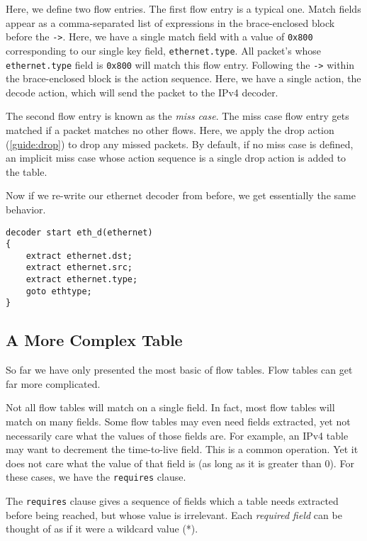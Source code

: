 Here, we define two flow entries. The first flow entry is a typical one. Match fields appear as a comma-separated list of expressions in the brace-enclosed block before the \texttt{->}. Here, we have a single match field with a value of \texttt{0x800} corresponding to our single key field, \texttt{ethernet.type}. All packet's whose \texttt{ethernet.type} field is \texttt{0x800} will match this flow entry. Following the \texttt{->} within the brace-enclosed block is the action sequence. Here, we have a single action, the decode action, which will send the packet to the IPv4 decoder.

The second flow entry is known as the \textit{miss case}. The miss case flow entry gets matched if a packet matches no other flows. Here, we apply the drop action (\ref{guide:drop}) to drop any missed packets. By default, if no miss case is defined, an implicit miss case whose action sequence is a single drop action is added to the table.

Now if we re-write our ethernet decoder from before, we get essentially the same behavior.

\begin{codepage}
\begin{lstlisting}
decoder start eth_d(ethernet)
{
	extract ethernet.dst;
	extract ethernet.src;
	extract ethernet.type;
	goto ethtype;
}
\end{lstlisting}
\end{codepage}

\subsection{A More Complex Table} \label{tut:complex_table}

So far we have only presented the most basic of flow tables. Flow tables can get far more complicated.

Not all flow tables will match on a single field. In fact, most flow tables will match on many fields. Some flow tables may even need fields extracted, yet not necessarily care what the values of those fields are. For example, an IPv4 table may want to decrement the time-to-live field. This is a common operation. Yet it does not care what the value of that field is (as long as it is greater than 0). For these cases, we have the \texttt{requires} clause.

The \texttt{requires} clause gives a sequence of fields which a table needs extracted before being reached, but whose value is irrelevant. Each \textit{required field} can be thought of as if it were a wildcard value (*).

